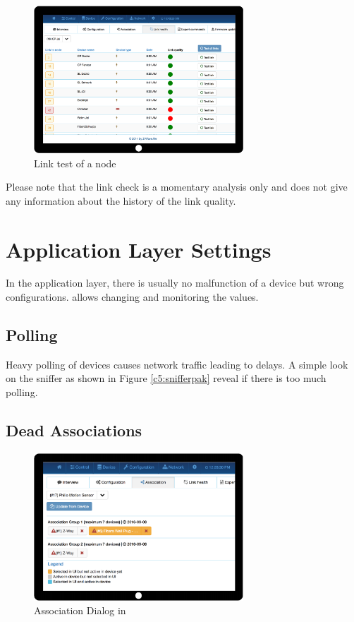 \begin{figure}
\begin{center}
\includegraphics[width=0.7\textwidth]{pngs/cap8/c5linktest.pdf}
\caption{Link test of a node}
\label{c5:linktest}
\end{center}
\end{figure}

Please note that the link check is a momentary analysis only and does not give any 
information about the history of the link quality.


\section{Application Layer Settings}

In the application layer, there is usually no malfunction of a device but wrong 
configurations. \zweui allows changing and monitoring the values.

\subsection{Polling}

Heavy polling of devices causes network traffic leading to delays. A simple look on the 
sniffer as shown in Figure \ref{c5:snifferpak} reveal if there is too much polling.

\subsection{Dead Associations}
\label{c5:deadassoc}

\begin{figure}
\begin{center}
\includegraphics[width=0.7\textwidth]{pngs/cap8/c4association.pdf}
\caption{Association Dialog in \zweui}
\label{c5:assoc}
\end{center}
\end{figure}

